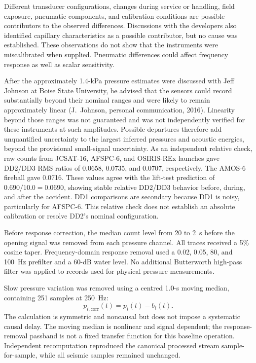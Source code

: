 \documentclass[]{seismica}
\begin{document}
Different transducer configurations, changes during service or handling,
field exposure, pneumatic components, and calibration conditions are possible
contributors to the observed differences. Discussions with the developers also
identified capillary characteristics as a possible contributor, but no cause
was established. These observations do not show that the instruments were
miscalibrated when supplied. Pneumatic differences could affect frequency
response as well as scalar sensitivity.

After the approximately 1.4-kPa pressure estimates were discussed with Jeff
Johnson at Boise State University, he advised that the sensors could record
substantially beyond their nominal ranges and were likely to remain
approximately linear (J.~Johnson, personal communication, 2016). Linearity
beyond those ranges was not guaranteed and was not independently verified
for these instruments at such amplitudes. Possible departures therefore add
unquantified uncertainty to the largest inferred pressures and acoustic
energies, beyond the provisional small-signal uncertainty. As an independent
relative check, raw counts from JCSAT-16, AFSPC-6, and OSIRIS-REx launches
gave DD2/DD3 RMS ratios of 0.0658, 0.0735, and 0.0707, respectively. The
AMOS-6 fireball gave 0.0716. These values agree with the lift-test prediction
of $0.690/10.0=0.0690$, showing stable relative DD2/DD3 behavior before,
during, and after the accident. DD1 comparisons are secondary because DD1 is
noisy, particularly for AFSPC-6. This relative check does not establish an
absolute calibration or resolve DD2's nominal configuration.

Before response correction, the median count level from 20 to 2~s before the
opening signal was removed from each pressure channel. All traces received a
5\% cosine taper. Frequency-domain response removal used a 0.02, 0.05, 80, and
100~Hz prefilter and a 60-dB water level. No additional Butterworth high-pass
filter was applied to records used for physical pressure measurements.

Slow pressure variation was removed using a centred 1.0-s moving median,
containing 251 samples at 250~Hz:
\begin{equation}
 p_{i,\mathrm{corr}}(t)=p_i(t)-b_i(t).
\end{equation}
The calculation is symmetric and noncausal but does not impose a systematic
causal delay. The moving median is nonlinear and signal dependent; the
response-removal passband is not a fixed transfer function for this baseline
operation. Independent recomputation reproduced the canonical processed
stream sample-for-sample, while all seismic samples remained unchanged.
\end{document}
